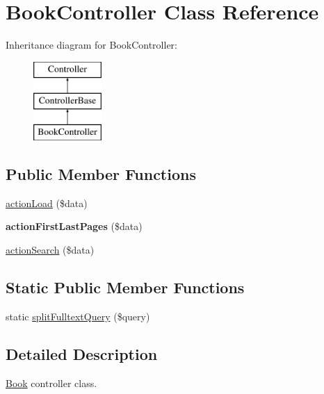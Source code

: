 \hypertarget{classBookController}{
\section{BookController Class Reference}
\label{classBookController}
}
Inheritance diagram for BookController:\begin{figure}[H]
\begin{center}
\leavevmode
\includegraphics[height=3.000000cm]{classBookController}
\end{center}
\end{figure}
\subsection*{Public Member Functions}
\begin{DoxyCompactItemize}
\item 
\hyperlink{classBookController_a6079dc1106ff410904978d50ca8d34a9}{actionLoad} (\$data)
\item 
\hypertarget{classBookController_a171e02784e1684da6151682bfd76d850}{
{\bfseries actionFirstLastPages} (\$data)}
\label{classBookController_a171e02784e1684da6151682bfd76d850}

\item 
\hyperlink{classBookController_a4504f609c873130b89fe8849621ea65e}{actionSearch} (\$data)
\end{DoxyCompactItemize}
\subsection*{Static Public Member Functions}
\begin{DoxyCompactItemize}
\item 
static \hyperlink{classBookController_adcf3d57be7a34444cb044754d5e11cb4}{splitFulltextQuery} (\$query)
\end{DoxyCompactItemize}


\subsection{Detailed Description}
\hyperlink{classBook}{Book} controller class. 

